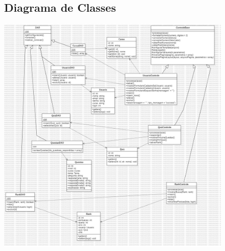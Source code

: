\documentclass{article}
\begin{document}
\begin{figure}
	\subsection{Diagrama de Classes}
  \includegraphics[width=1.1\textwidth,  keepaspectratio]{imagens/ClassDiagram1}
\end{figure}
\end{document}
